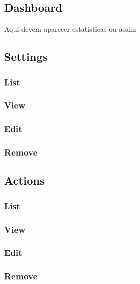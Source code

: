 \documentclass[english]{article}%
\begin{document}
\subsection{Dashboard}
Aqui devem aparecer estatisticas ou assim
\subsection{Settings}
\subsubsection{List}
\subsubsection{View}
\subsubsection{Edit}
\subsubsection{Remove}

\subsection{Actions}
\subsubsection{List}
\subsubsection{View}
\subsubsection{Edit}
\subsubsection{Remove}
\end{document}
